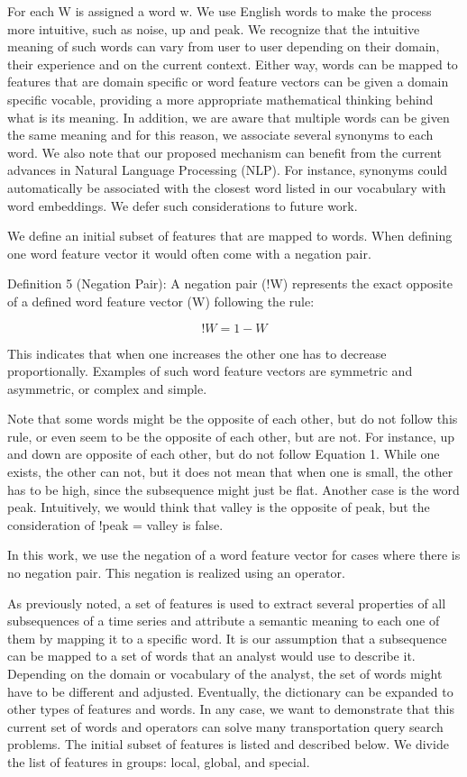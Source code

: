 For each W is assigned a word w. We use English words to make the process more intuitive, such as noise, up and peak. We recognize that the intuitive meaning of such words can vary from user to user depending on their domain, their experience and on the current context. Either way, words can be mapped to features that are domain specific or word feature vectors can be given a domain specific vocable, providing a more appropriate mathematical thinking behind what is its meaning. In addition, we are aware that multiple words can be given the same meaning and for this reason, we associate several synonyms to each word. We also note that our proposed mechanism can benefit from the current advances in Natural Language Processing (NLP). For instance, synonyms could automatically be associated with the closest word listed in our vocabulary with word embeddings. We defer such considerations to future work.

We define an initial subset of features that are mapped to words. When defining one word feature vector it would often come with a negation pair.

Definition 5 (Negation Pair): A negation pair (!W) represents the exact opposite of a defined word feature vector (W) following the rule:

\begin{equation}
!W = 1-W
\end{equation}


This indicates that when one increases the other one has to decrease proportionally. Examples of such word feature vectors are symmetric and asymmetric, or complex and simple. 

Note that some words might be the opposite of each other, but do not follow this rule, or even seem to be the opposite of each other, but are not. For instance, up and down are opposite of each other, but do not follow Equation 1. While one exists, the other can not, but it does not mean that when one is small, the other has to be high, since the subsequence might just be flat. Another case is the word peak. Intuitively, we would think that valley is the opposite of peak, but the consideration of !peak = valley is false. 

In this work, we use the negation of a word feature vector for cases where there is no negation pair. This negation is realized using an operator.



As previously noted, a set of features is used to extract several properties of all subsequences of a time series and attribute a semantic meaning to each one of them by mapping it to a specific word. It is our assumption that a subsequence can be mapped to a set of words that an analyst would use to describe it. Depending on the domain or vocabulary of the analyst, the set of words might have to be different and adjusted. Eventually, the dictionary can be expanded to other types of features and words. In any case, we want to demonstrate that this current set of words and operators can solve many transportation query search problems.
The initial subset of features is listed and described below. We divide the list of features in groups: local, global, and special. 

